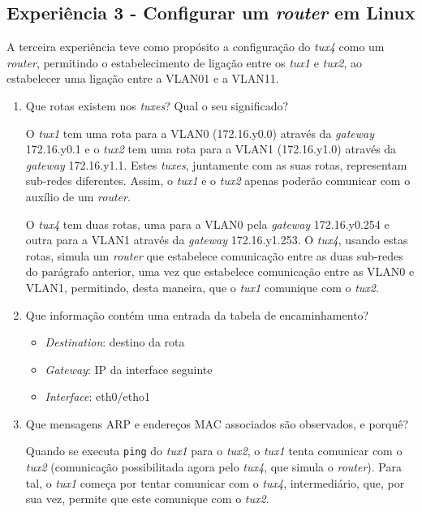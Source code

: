 \documentclass{article}
\begin{document}
\subsection{Experiência 3 - Configurar um \textit{router} em Linux}
A terceira experiência teve como propósito a configuração do \textit{tux4} como um \textit{router}, permitindo o estabelecimento de ligação entre os \textit{tux1} e \textit{tux2}, ao estabelecer uma ligação entre a VLAN01 e a VLAN11.
\begin{enumerate}
\item Que rotas existem nos \textit{tuxes}? Qual o seu significado?

O \textit{tux1} tem uma rota para a VLAN0 (172.16.y0.0) através da \textit{gateway} 172.16.y0.1 e o \textit{tux2} tem uma rota para a VLAN1 (172.16.y1.0) através da \textit{gateway} 172.16.y1.1. Estes \textit{tuxes}, juntamente com as suas rotas, representam sub-redes diferentes. Assim, o \textit{tux1} e o \textit{tux2} apenas poderão comunicar com o auxílio de um \textit{router}.

O \textit{tux4} tem duas rotas, uma para a VLAN0 pela \textit{gateway} 172.16.y0.254 e outra para a VLAN1 através da \textit{gateway} 172.16.y1.253. O \textit{tux4}, usando estas rotas, simula um \textit{router} que estabelece comunicação entre as duas sub-redes do parágrafo anterior, uma vez que estabelece comunicação entre as VLAN0 e VLAN1, permitindo, desta maneira, que o \textit{tux1} comunique com o \textit{tux2}.


\item Que informação contém uma entrada da tabela de encaminhamento?

\begin{itemize}
    \item \textit{Destination}: destino da rota
    \item \textit{Gateway}: IP da interface seguinte
    \item \textit{Interface}: eth0/etho1
\end{itemize}


\item Que mensagens ARP e endereços MAC associados são observados, e porquê?

Quando se executa \texttt{ping} do \textit{tux1} para o \textit{tux2}, o \textit{tux1} tenta comunicar com o \textit{tux2} (comunicação possibilitada agora pelo \textit{tux4}, que simula o \textit{router}). Para tal, o \textit{tux1} começa por tentar comunicar com o \textit{tux4}, intermediário, que, por sua vez, permite que este comunique com o \textit{tux2}.


\end{enumerate}
\end{document}
